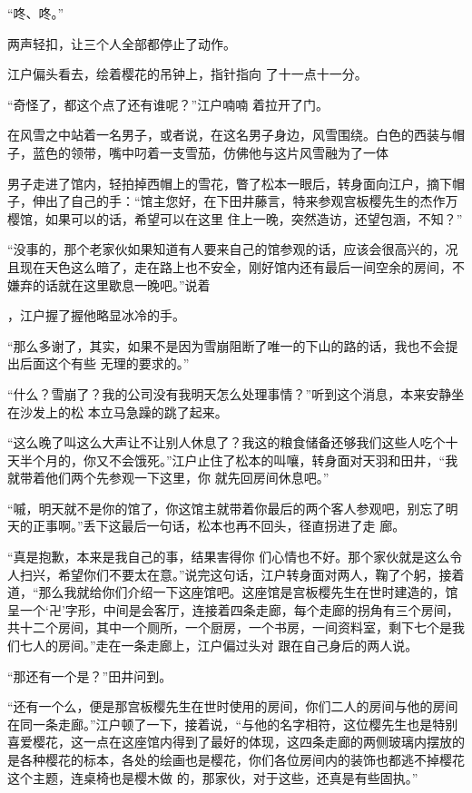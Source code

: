 \documentclass{article}
\begin{document}
“咚、咚。” 


两声轻扣，让三个人全部都停止了动作。 

\newpage

江户偏头看去，绘着樱花的吊钟上，指针指向
了十一点十一分。 

“奇怪了，都这个点了还有谁呢？”江户喃喃
着拉开了门。 

在风雪之中站着一名男子，或者说，在这名男子身边，风雪围绕。白色的西装与帽子，蓝色的领带，嘴中叼着一支雪茄，仿佛他与这片风雪融为了一体

男子走进了馆内，轻拍掉西帽上的雪花，瞥了松本一眼后，转身面向江户，摘下帽子，伸出了自己的手：“馆主您好，在下田井藤言，特来参观宫板樱先生的杰作万樱馆，如果可以的话，希望可以在这里
住上一晚，突然造访，还望包涵，不知？” 

“没事的，那个老家伙如果知道有人要来自己的馆参观的话，应该会很高兴的，况且现在天色这么暗了，走在路上也不安全，刚好馆内还有最后一间空余的房间，不嫌弃的话就在这里歇息一晚吧。”说着

\newpage
，江户握了握他略显冰冷的手。 

“那么多谢了，其实，如果不是因为雪崩阻断了唯一的下山的路的话，我也不会提出后面这个有些
无理的要求的。” 

“什么？雪崩了？我的公司没有我明天怎么处理事情？”听到这个消息，本来安静坐在沙发上的松
本立马急躁的跳了起来。 

“这么晚了叫这么大声让不让别人休息了？我这的粮食储备还够我们这些人吃个十天半个月的，你又不会饿死。”江户止住了松本的叫嚷，转身面对天羽和田井，“我就带着他们两个先参观一下这里，你
就先回房间休息吧。” 

“嘁，明天就不是你的馆了，你这馆主就带着你最后的两个客人参观吧，别忘了明天的正事啊。”丢下这最后一句话，松本也再不回头，径直拐进了走
廊。 

“真是抱歉，本来是我自己的事，结果害得你
\newpage
们心情也不好。那个家伙就是这么令人扫兴，希望你们不要太在意。”说完这句话，江户转身面对两人，鞠了个躬，接着道，“那么我就给你们介绍一下这座馆吧。这座馆是宫板樱先生在世时建造的，馆呈一个‘卍’字形，中间是会客厅，连接着四条走廊，每个走廊的拐角有三个房间，共十二个房间，其中一个厕所，一个厨房，一个书房，一间资料室，剩下七个是我们七人的房间。”走在一条走廊上，江户偏过头对
跟在自己身后的两人说。 


“那还有一个是？”田井问到。 

“还有一个么，便是那宫板樱先生在世时使用的房间，你们二人的房间与他的房间在同一条走廊。”江户顿了一下，接着说，“与他的名字相符，这位樱先生也是特别喜爱樱花，这一点在这座馆内得到了最好的体现，这四条走廊的两侧玻璃内摆放的是各种樱花的标本，各处的绘画也是樱花，你们各位房间内的装饰也都逃不掉樱花这个主题，连桌椅也是樱木做
的，那家伙，对于这些，还真是有些固执。” 
\end{document}
